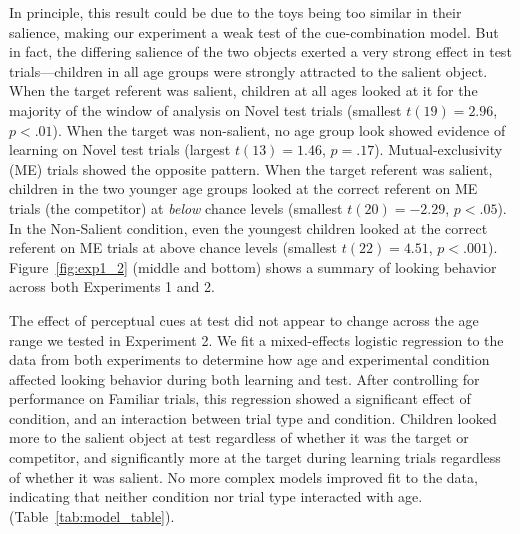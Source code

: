 \documentclass[man,floatsintext]{apa6}
\begin{document}
In principle, this result could be due to the toys being too similar in their salience, making our experiment a weak test of the cue-combination model. But in fact, the differing salience of the two objects exerted a very strong effect in test trials---children in all age groups were strongly attracted to the salient object. When the target referent was salient, children at all ages looked at it for the majority of the window of analysis on Novel test trials (smallest $t(19)  = 2.96$, $p < .01$). When the target was non-salient, no age group look showed evidence of learning on Novel test trials (largest $t(13)  = 1.46$, $p = .17$). Mutual-exclusivity (ME) trials showed the opposite pattern. When the target referent was salient, children in the two younger age groups looked at the correct referent on ME trials (the competitor) at \emph{below} chance levels (smallest $t(20) = -2.29$, $p < .05$). In the Non-Salient condition, even the youngest children looked at the correct referent on ME trials at above chance levels (smallest $t(22) = 4.51$, $p < .001$). Figure~\ref{fig:exp1_2} (middle and bottom) shows a summary of looking behavior across both Experiments 1 and 2.

The effect of perceptual cues at test did not appear to change across the age range we tested in Experiment 2. We fit a mixed-effects logistic regression to the data from both experiments to determine how age and experimental condition affected looking behavior during both learning and test. After controlling for performance on Familiar trials, this regression showed a significant effect of condition, and an interaction between trial type and condition. Children looked more to the salient object at test regardless of whether it was the target or competitor, and significantly more at the target during learning trials regardless of whether it was salient. No more complex models improved fit to the data, indicating that neither condition nor trial type interacted with age. (Table~\ref{tab:model_table}). 
\end{document}
